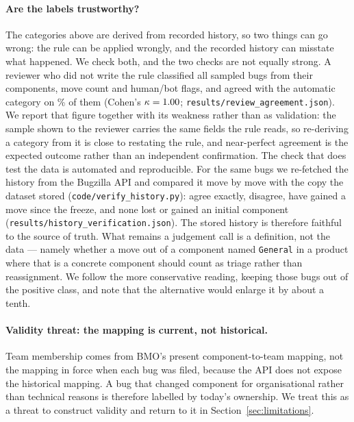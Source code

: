 \documentclass[sigconf,anonymous]{acmart}
\begin{document}


\paragraph{Are the labels trustworthy?}
The categories above are derived from recorded history, so two things can go wrong: the rule can be
applied wrongly, and the recorded history can misstate what happened. We check both, and the two
checks are not equally strong. A reviewer who did not write the rule classified all \nReviewN{}
sampled bugs from their components, move count and human/bot flags, and agreed with the automatic
category on \nReviewAgree\% of them (Cohen's $\kappa = 1.00$;
\texttt{results/review\_agreement.json}). We report that figure together with its weakness rather
than as validation: the sample shown to the reviewer carries the same fields the rule reads, so
re-deriving a category from it is close to restating the rule, and near-perfect agreement is the
expected outcome rather than an independent confirmation. The check that does test the data is
automated and reproducible. For the same \nVerifyN{} bugs we re-fetched the history from the
Bugzilla API and compared it move by move with the copy the dataset stored
(\texttt{code/verify\_history.py}): \nVerifyMatch{} agree exactly, \nVerifyMismatch{} disagree,
\nVerifyExtra{} have gained a move since the freeze, and none lost or gained an initial component
(\texttt{results/history\_verification.json}). The stored history is therefore faithful to the
source of truth. What remains a judgement call is a definition, not the data --- namely whether a
move out of a component named \texttt{General} in a product where that is a concrete component
should count as triage rather than reassignment. We follow the more conservative reading, keeping
those \nNonFirefoxGeneral{} bugs out of the positive class, and note that the alternative would
enlarge it by about a tenth.

\paragraph{Validity threat: the mapping is current, not historical.}
Team membership comes from BMO's present component-to-team mapping, not the mapping in force when
each bug was filed, because the API does not expose the historical mapping. A bug that changed
component for organisational rather than technical reasons is therefore labelled by today's
ownership. We treat this as a threat to construct validity and return to it in
Section~\ref{sec:limitations}.
\end{document}
